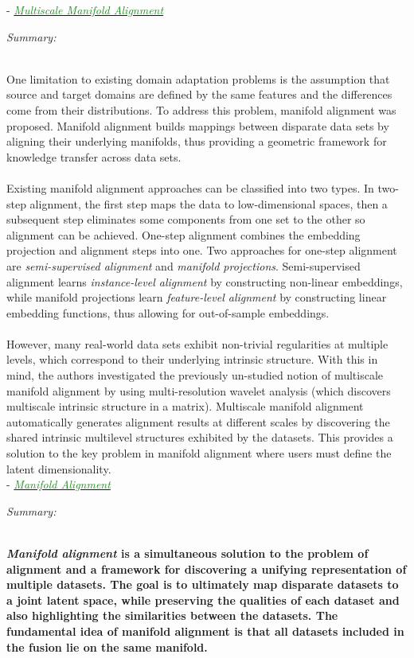 \documentclass[]{article}
\newcommand{\paperentry}[4]{
            \hangindent=1cm
            \textcolor{red}{\cite{#1}} - \href{run:../References/#3}{\textcolor{ForestGreen}{\textit{#2}}}
            
            \noindent            
            \begin{minipage}[t]{0.1\linewidth}\hfill\end{minipage}
            \begin{minipage}[t]{0.8\linewidth}\textcolor{NavyBlue}{{\textit{Summary:}}}#4\end{minipage}
            \vspace{.25cm}
          }
\begin{document}
		\paperentry{Wang2010MultiscaleManAlignment}
		{Multiscale Manifold Alignment}
		{Manifold_Representation_Learning/Alignment/Wang2010mMultiscaleManAlignment.pdf}
		{}\\
		One limitation to existing domain adaptation problems is the assumption that source and target domains are defined by the same features and the differences come from their distributions.  To address this problem, manifold alignment was proposed.  Manifold alignment builds mappings between disparate data sets by aligning their underlying manifolds, thus providing a geometric framework for knowledge transfer across data sets.
		\\ \\
		Existing manifold alignment approaches can be classified into two types. In two-step alignment, the first step maps the data to low-dimensional spaces, then a subsequent step eliminates some components from one set to the other so alignment can be achieved.  One-step alignment combines the embedding projection and alignment steps into one.  Two approaches for one-step alignment are \textit{semi-supervised alignment} and \textit{manifold projections}. Semi-supervised alignment learns \textit{instance-level alignment} by constructing non-linear embeddings, while manifold projections learn \textit{feature-level alignment} by constructing linear embedding functions, thus allowing for out-of-sample embeddings.
		\\ \\
		However, many real-world data sets exhibit non-trivial regularities at multiple levels, which correspond to their underlying intrinsic structure.  With this in mind, the authors investigated the previously un-studied notion of multiscale manifold alignment by using multi-resolution wavelet analysis (which discovers multiscale intrinsic structure in a matrix).  Multiscale manifold alignment automatically generates alignment results at different scales by discovering the shared intrinsic multilevel structures exhibited by the datasets.  This provides a solution to the key problem in manifold alignment where users must define the latent dimensionality.  \\
		
		\paperentry{Wang2011ManifoldAlignment}
		{Manifold Alignment}
		{Manifold_Representation_Learning/Alignment/Wang2011ManifoldAlignment.pdf}
		{} \\ \textbf{\textit{Manifold alignment} is a simultaneous solution to the problem of alignment and a framework for discovering a unifying representation of multiple datasets.  The goal is  to ultimately map disparate datasets to a joint latent space, while preserving the qualities of each dataset and also highlighting the similarities between the datasets. The fundamental idea of manifold alignment is that all datasets included in the fusion lie on the same manifold.} \\ \\
		
\end{document}
